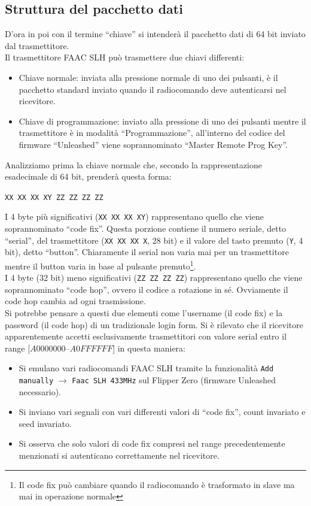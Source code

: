 \subsection{Struttura del pacchetto dati}
\label{sub:payload}
D’ora in poi con il termine “chiave” si intenderà il pacchetto dati di 64 bit inviato dal trasmettitore.\\
Il trasmettitore FAAC SLH può trasmettere due chiavi differenti:
\begin{itemize}
  \item Chiave normale: inviata alla pressione normale di uno dei pulsanti, è il pacchetto standard inviato quando il radiocomando deve autenticarsi nel ricevitore.
  \item Chiave di programmazione: inviato alla pressione di uno dei pulsanti mentre il trasmettitore è in modalità “Programmazione”, all’interno del codice del firmware “Unleashed” viene soprannominato “Master Remote Prog Key”.
\end{itemize}
Analizziamo prima la chiave normale che, secondo la rappresentazione esadecimale di 64 bit, prenderà questa forma:
\begin{center}
  \texttt{XX XX XX XY ZZ ZZ ZZ ZZ}
\end{center}
I 4 byte più significativi (\texttt{XX XX XX XY}) rappresentano quello che viene soprannominato “code fix”. Questa porzione contiene il numero seriale, detto “serial”, del trasmettitore (\texttt{XX XX XX X}, 28 bit) e il valore del tasto premuto (\texttt{Y}, 4 bit), detto “button”. Chiaramente il serial non varia mai per un trasmettitore mentre il button varia in base al pulsante premuto\footnote{Il code fix può cambiare quando il radiocomando è trasformato in slave ma mai in operazione normale}.\\
I 4 byte (32 bit) meno significativi (\texttt{ZZ ZZ ZZ ZZ}) rappresentano quello che viene soprannominato “code hop”, ovvero il codice a rotazione in sé. Ovviamente il code hop cambia ad ogni trasmissione.\\
Si potrebbe pensare a questi due elementi come l’username (il code fix) e la password (il code hop) di un tradizionale login form.
Si è rilevato che il ricevitore apparentemente accetti esclusivamente trasmettitori con valore serial entro il range [$A0000000$--$A0FFFFFF$] in questa maniera:\\
\begin{itemize}
  \item Si emulano vari radiocomandi FAAC SLH tramite la funzionalità \texttt{Add manually} \(\rightarrow\) \texttt{Faac SLH 433MHz} sul Flipper Zero (firmware Unleashed necessario).
  \item Si inviano vari segnali con vari differenti valori di “code fix”, count invariato e seed invariato.
  \item Si osserva che solo valori di code fix compresi nel range precedentemente menzionati si autenticano correttamente nel ricevitore.
\end{itemize}
